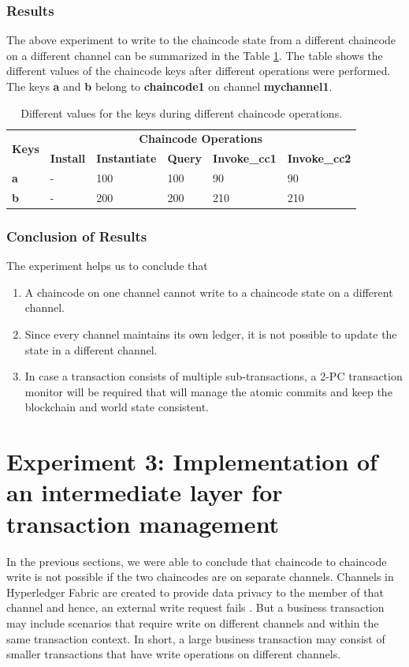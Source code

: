 \documentclass[
  a4paper,  %
  twoside,  %
  bibliography=totoc,
  headsepline,
  cleardoublepage=empty,
  parskip=half,
  draft=false
]{scrbook}
\begin{document}
\subsubsection{Results}
The above experiment to write to the chaincode state from a  different chaincode on a different channel can be summarized in the Table \ref{tab:result22}. The table shows the different values of the chaincode keys after different operations were performed. The keys \textbf{a} and \textbf{b} belong to \textbf{chaincode1} on channel \textbf{mychannel1}.
\begin{table}[h!]
\begin{center}
    \begin{tabular}{ |l|l|l|l|l|l|}
    \hline
    \multirow{2}{*}{\textbf{Keys}} & \multicolumn{5}{c|}{\textbf{Chaincode Operations}}\\ \cline{2-6}
    &\textbf{Install}& \textbf{Instantiate}& \textbf{Query}& \textbf{Invoke\_cc1}& \textbf{Invoke\_cc2} \\ \hline
    \textbf{a} & - & 100 & 100 & 90 & 90 \\ \hline
    \textbf{b} & - & 200 & 200 & 210 & 210 \\ \hline
    \end{tabular}
\end{center}
\caption{Different values for the keys during different chaincode operations.}
\label{tab:result22}
\end{table}
\subsubsection{Conclusion of Results}
The experiment helps us to conclude that 
\begin{enumerate}
\item A chaincode on one channel cannot write to a chaincode state on a different channel.
\item Since every channel maintains its own ledger, it is not possible to update the state in a different channel.
\item In case a transaction consists of multiple sub-transactions, a 2-PC transaction monitor will be required that will manage the atomic commits and keep the blockchain and world state consistent.
\end{enumerate}

\section{Experiment 3: Implementation of an intermediate layer for transaction management}
In the previous sections, we were able to conclude that chaincode to chaincode write is not possible if the two chaincodes are on separate channels. Channels in Hyperledger Fabric are created to provide data privacy to the member of that channel and hence, an external write request fails \cite{Channels}. But a business transaction may include scenarios that require write on different channels and within the same transaction context. In short, a large business transaction may consist of smaller transactions that have write operations on different channels.
\end{document}
